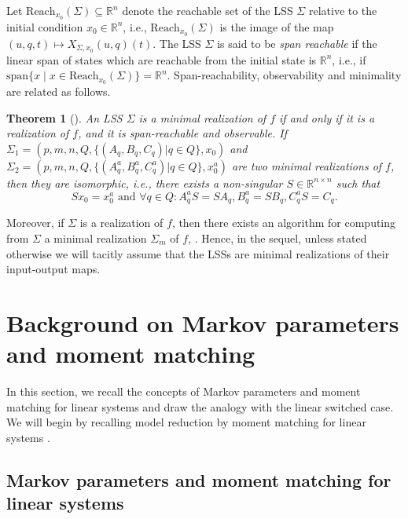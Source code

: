 \documentclass[journal]{IEEEtran}
\newcommand{\SPAN}{\mathrm{span}}
\newtheorem{Theorem}{Theorem}
\begin{document}
Let $\mathrm{Reach}_{x_0}(\Sigma)\subseteq \mathbb{R}^n$ denote the reachable set of the LSS $\Sigma$ relative to the initial condition $x_0\in \mathbb{R}^n$, i.e., $\mathrm{Reach}_{x_0}(\Sigma)$ is the image of the map $(u,q,t)\mapsto X_{\Sigma,x_0}(u,q)(t)$. The LSS $\Sigma$ is said to be \emph{span reachable} if the linear span of states which are reachable from the initial state is $\mathbb{R}^n$, i.e., if $\SPAN\{x \mid x \in \mathrm{Reach}_{x_0}(\Sigma) \}=\mathbb{R}^n$. Span-reachability, observability and minimality are related as follows.
\begin{Theorem}[\cite{MP:BigArticlePartI}]
	An LSS $\Sigma$ is a minimal realization of $f$ if and only if it is a realization of $f$, and it is span-reachable and observable. If $\Sigma_1 = (p,m,n,Q,\{(A_q,B_q,C_q)|q \in Q\},x_0)$ and $\Sigma_{2}= (p,m,n,Q,\{(A_q^a,B_q^a,C_q^a)|q \in Q\},x_0^a)$ are two minimal realizations of $f$, then they are \emph{isomorphic}, i.e., there exists a non-singular $S \in \mathbb{R}^{n \times n}$ such that
	\begin{equation*}
		Sx_0=x_0^a \mbox{ and } \forall q \in Q:
		A^{a}_{q}S=SA_{q},  B_{q}^{a}=SB_{q},
		C_{q}^{a}S=C_{q}.
	\end{equation*}
\end{Theorem}
Moreover, if $\Sigma$ is a realization of $f$, then there exists an algorithm for computing from $\Sigma$ a minimal realization $\Sigma_m$ of $f$, \cite{MP:BigArticlePartI,petreczky2013}. Hence, in the sequel, unless stated otherwise we will tacitly assume that the LSSs are minimal realizations of their input-output maps.

\section{Background on Markov parameters and moment matching}
\label{sect:markov}

In this section, we recall the concepts of Markov parameters and moment matching for linear systems and draw the analogy with the linear switched case. We will begin by recalling model reduction by moment matching for linear systems \cite{antoulas}.

\subsection{Markov parameters and moment matching for linear systems}
\end{document}
